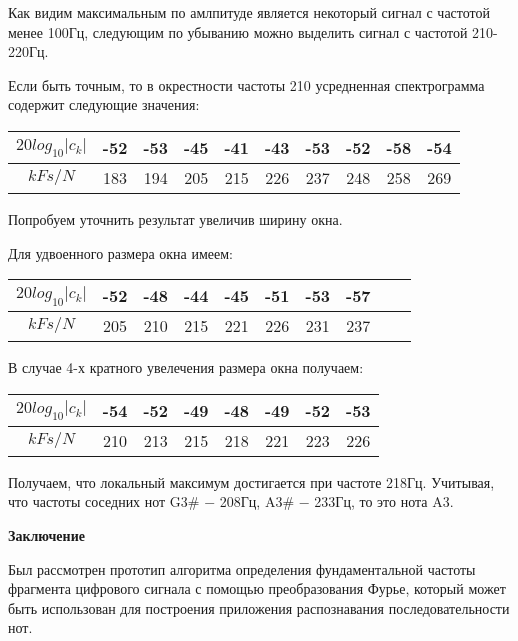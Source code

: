 \documentclass[oneside, final, 14pt]{extarticle}
\begin{document}
	Как видим максимальным по амлпитуде является некоторый сигнал с частотой менее
	100Гц, следующим по убыванию можно выделить сигнал с частотой 210-220Гц.

	Если быть точным, то в окрестности частоты 210 усредненная спектрограмма содержит
	следующие значения:

	\begin{tabular}[t]{|c|c|c|c|c|c|c|c|c|c|}
		\hline
		$20 log_{10}|c_k|$ & -52 & -53 & -45 & -41 & -43 & -53 & -52 & -58 & -54 \\
		\hline
		$k Fs/N$ & 183 & 194 & 205 & 215 & 226 & 237 & 248 & 258 & 269 \\
		\hline
	\end{tabular}

	Попробуем уточнить результат увеличив ширину окна.

	Для удвоенного размера окна имеем:

	\begin{tabular}[t]{|c|c|c|c|c|c|c|c|c|c|}
		\hline
		$20 log_{10}|c_k|$ & -52 & -48 & -44 & -45 & -51 & -53 & -57 \\
		\hline
		$k Fs/N$ & 205 & 210 & 215 & 221 & 226 & 231 & 237 \\
		\hline
	\end{tabular}

	В случае 4-х кратного увелечения размера окна получаем:

	\begin{tabular}[t]{|c|c|c|c|c|c|c|c|}
		\hline
		$20 log_{10}|c_k|$ & -54 & -52 & -49 & -48 & -49 & -52 & -53 \\
		\hline
		$k Fs/N$ & 210 & 213 & 215 & 218 & 221 & 223 & 226 \\
		\hline
	\end{tabular}


	Получаем, что локальный максимум достигается при частоте 218Гц. Учитывая,
	что частоты соседних нот G3\# $-$ 208Гц, A3\# $-$ 233Гц, то это нота A3.

\cleardoublepage

{\large \bf Заключение \\}
	Был рассмотрен прототип алгоритма определения фундаментальной частоты фрагмента
	цифрового сигнала с помощью преобразования Фурье, который может быть
	использован для построения приложения распознавания последовательности нот.
\end{document}
